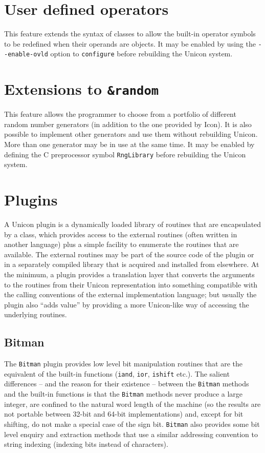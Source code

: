 
\section{User defined operators}
This feature extends the syntax of classes to allow the built-in operator
symbols to be redefined when their operands are objects. It may be enabled by
using the \texttt{-{}-enable-ovld} option to \texttt{configure} before
rebuilding the Unicon system.

\section{Extensions to \texttt{\&random}}
This feature allows the programmer to choose from a portfolio of different
random number generators (in addition to the one provided by Icon). It is also
possible to implement other generators and use them without rebuilding Unicon.
More than one generator may be in use at the same time.
It may be enabled by defining the C preprocessor symbol \texttt{RngLibrary}
before rebuilding the Unicon system.

\section{Plugins}
A Unicon plugin is a dynamically loaded library of routines that are
encapsulated by a class, which provides access to the external routines (often
written in another language) plus a simple facility to enumerate the routines
that are available. The external routines may be part of the source code of the
plugin or in a separately compiled library that is acquired and installed from
elsewhere. At the minimum, a plugin provides a translation layer that converts
the arguments to the routines from their Unicon representation into something
compatible with the calling conventions of the external implementation language;
but usually the plugin also ``adds value'' by providing a more Unicon-like way
of accessing the underlying routines.

\subsection{Bitman}
The \texttt{Bitman} plugin provides low level bit manipulation routines that are
the equivalent of the built-in functions (\texttt{iand}, \texttt{ior},
\texttt{ishift} etc.). The salient differences -- and the reason for their
existence -- between the \texttt{Bitman} methods and the built-in functions is
that the \texttt{Bitman} methods never produce a large integer, are confined to
the natural word length of the machine (so the results are not portable between
32-bit and 64-bit implementations) and, except for bit shifting, do not make a
special case of the sign bit.  \texttt{Bitman} also provides some bit level
enquiry and extraction methods that use a similar addressing convention to
string indexing (indexing bits instead of characters).

